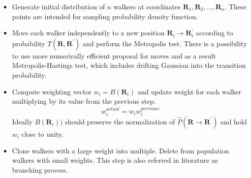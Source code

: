 \documentclass[twoside,english]{uiofysmaster}
\begin{document}
\begin{itemize}
	\item
	Generate initial distribution of $n$ walkers at coordinates $\boldsymbol{R}_1, \boldsymbol{R}_2, \dots , \boldsymbol{R}_n$. These points are intended for sampling probability density function.
	\item
	Move each walker independently to a new position $\boldsymbol{R}_i \rightarrow \boldsymbol{R}_i^\prime$ according to probability $T(\boldsymbol{R}, \boldsymbol{R^\prime})$ and perform the Metropolis test. There is a possibility to use more numerically efficient proposal for moves and as a result Metropolis-Hastings test, which includes drifting Gaussian into the transition probability.
	\item
	Compute weighting vector $w_i = B(\boldsymbol{R}_i)$ and update weight for each walker multiplying by its value from the previous step.
	\begin{equation}
	w_i^{actual} = w_i w_i^{previous}
	\end{equation}
	Ideally $B(\boldsymbol{R}_i))$ should preserve the normalization of $\hat{P}(\boldsymbol{R}\rightarrow\boldsymbol{R}^\prime)$ and hold $w_i$ close to unity.
	\item
	Clone walkers with a large weight into multiple. Delete from population walkers with small weights.
	This step is also referred in literature as branching process.
	
\end{itemize}
\end{document}
